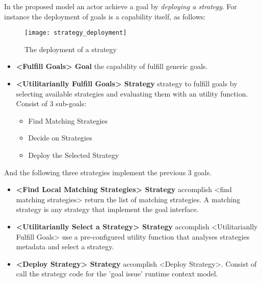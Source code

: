 In the proposed model an actor achieve a goal by \emph{deploying a strategy}. For instance the deployment of goals is a capability itself, as follows:

\begin{figure}
  \centering
  \texttt{[image: strategy\_deployment]}
  \caption{The deployment of a strategy}
  \label{fig:agent_composition}
\end{figure}

\begin{itemize}

\item \textbf{<Fulfill Goals> Goal} the capability of fulfill generic goals.

\item \textbf{<Utilitarianlly Fulfill Goals> Strategy } strategy to fulfill goals by selecting available strategies and evaluating them with an utility function. Consist of 3 sub-goals:
  \begin{itemize}
    \item Find Matching Strategies
    \item Decide on Strategies
    \item Deploy the Selected Strategy
  \end{itemize}
\end{itemize}

And the following three strategies implement the previous 3 goals.

\begin{itemize}
  \item \textbf{<Find Local Matching Strategies> Strategy} accomplish <find matching strategies>
  return the list of matching strategies. A matching strategy is any strategy that implement the goal interface.

  \item \textbf{<Utilitarianlly Select a Strategy> Strategy} accomplish <Utilitarianlly Fulfill Goals>
  use a pre-configured utility function that analyses strategies metadata and select a strategy.

  \item \textbf{<Deploy Strategy> Strategy} accomplish <Deploy Strategy>.
  Consist of call the strategy code for the 'goal issue' runtime context model.
\end{itemize}

%
%
%
%
%
%
%
